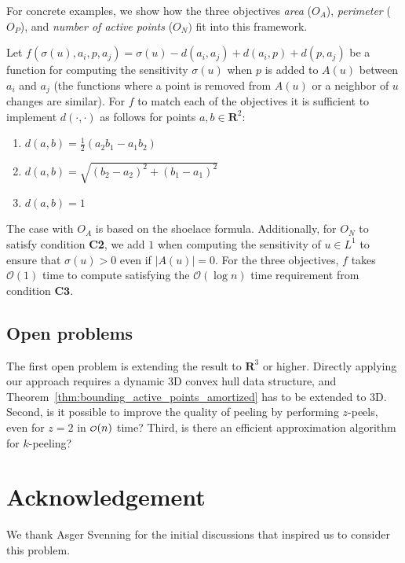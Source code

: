 \documentclass{cccg24}
\newcommand{\Oh}[1]{\mathcal{O}\!\lrParents{#1}}
\newcommand{\OhSmall}[1]{
  \mathchoice
    {{\scriptstyle\mathcal{O}}}%
    {{\scriptstyle\mathcal{O}}}%
    {{\scriptscriptstyle\mathcal{O}}}%
    {\scalebox{.6}{$\scriptscriptstyle\mathcal{O}$}}\!\lrParents{#1}%
  }
\newcommand{\lrParents}[1]{\left( #1 \right)}
\newcommand{\dist}[2]{d\!\left( #1, #2 \right)}
\newcommand{\f}[1]{f\!\left( #1 \right)}
\newcommand{\logn}{\log{n}}
\newcommand{\R}{\mathbf{R}}
\newcommand{\sens}[1]{\sigma\!\lrParents{#1}}
\begin{document}
For concrete examples, we show how the three objectives \emph{area} ($O_A$), \emph{perimeter} ($O_P$), and \emph{number of active points} ($O_N)$ fit into this framework. 

Let $\f{\sens{u}, a_i, p, a_{j}} = \sens{u} - \dist{a_i}{a_{j}} + \dist{a_i}{p} + \dist{p}{a_{j}}$ be a function for computing the sensitivity $\sens{u}$ when $p$ is added to $A(u)$ between $a_i$ and $a_{j}$ (the functions where a point is removed from $A(u)$ or a neighbor of $u$ changes are similar).  
For $f$ to match each of the objectives it is sufficient to implement $\dist{\cdot}{\cdot}$ as follows for points $a,b\in\R^2$:

\begin{enumerate}
    \item[$O_A$:] $\dist{a}{b} = \frac{1}{2} \lrParents{a_2 b_1 - a_1 b_2} $
    \item[$O_P$:] $ \dist{a}{b} = \sqrt{\lrParents{b_2 - a_2}^2 + \lrParents{b_1 - a_1}^2} $
    \item[$O_N$:] $ \dist{a}{b} = 1 $
\end{enumerate}

The case with $O_A$ is based on the shoelace formula. Additionally, for $O_N$ to satisfy condition \textbf{C2}, we add $1$ when computing the sensitivity of $u \in L^1$ to ensure that $\sens u > 0$ even if $|A(u)| = 0$.
For the three objectives, $f$ takes $\Oh{1}$ time to compute satisfying the $\Oh{\logn}$ time requirement from condition $\textbf{C3}$.

\subsection{Open problems}
The first open problem is extending the result to $\R^3$ or higher. Directly applying our approach requires a dynamic 3D convex hull data structure, and Theorem~\ref{thm:bounding_active_points_amortized} has to be extended to 3D. Second, is it possible to improve the quality of peeling by performing $z$-peels, even for $z = 2$ in $\OhSmall{n}$ time? Third, is there an efficient approximation algorithm for $k$-peeling? 

\section*{Acknowledgement}
We thank Asger Svenning for the initial discussions that inspired us to consider this problem.
\end{document}
